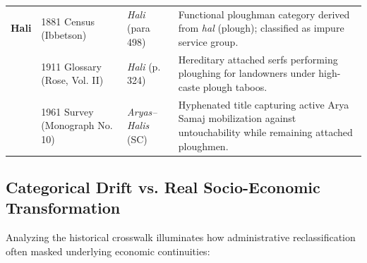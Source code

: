 \documentclass[11pt,a4paper]{article}
\begin{document}
\begin{table}[htbp]
\begin{tabularx}{\textwidth}{llp{2.8cm}X}
\midrule
\textbf{Hali} & 1881 Census (Ibbetson) & \textit{Hali} (para 498) & Functional ploughman category derived from \textit{hal} (plough); classified as impure service group. \\
& 1911 Glossary (Rose, Vol. II) & \textit{Hali} (p. 324) & Hereditary attached serfs performing ploughing for landowners under high-caste plough taboos. \\
& 1961 Survey (Monograph No. 10) & \textit{Aryas--Halis} (SC) & Hyphenated title capturing active Arya Samaj mobilization against untouchability while remaining attached ploughmen. \\
\bottomrule
\end{tabularx}
\end{table}

\subsection{Categorical Drift vs. Real Socio-Economic Transformation}
Analyzing the historical crosswalk illuminates how administrative reclassification often masked underlying economic continuities:
\end{document}
